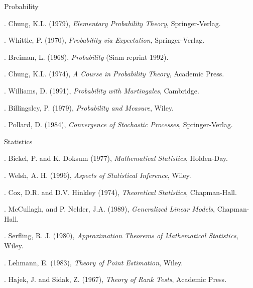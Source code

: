\vspace{5mm}
\noindent
Probability

\vspace{3mm}
.   Chung, K.L. (1979), {\it Elementary Probability Theory}, Springer-Verlag.

.   Whittle, P. (1970), {\it Probability via Expectation}, Springer-Verlag.

.   Breiman, L. (1968), {\it Probability} (Siam reprint 1992).

.   Chung, K.L. (1974), {\it A Course in Probability Theory}, Academic Press.

.   Williams, D. (1991), {\it Probability with Martingales}, Cambridge.

.   Billingsley, P. (1979), {\it Probability and Measure}, Wiley.

.   Pollard, D. (1984), {\it Convergence of Stochastic Processes}, Springer-Verlag.

\vspace{3mm}
\noindent
Statistics

\vspace{3mm}
.  Bickel, P. and K. Doksum (1977), {\it Mathematical Statistics}, Holden-Day.

.  Welsh, A. H. (1996), {\it Aspects of Statistical Inference}, Wiley.

.   Cox, D.R. and D.V. Hinkley (1974), {\it Theoretical Statistics}, Chapman-Hall.

.   McCullagh,  and P. Nelder, J.A. (1989), {\it Generalized Linear Models}, Chapman-Hall.

.   Serfling, R. J. (1980), {\it Approximation Theorems of Mathematical 
Statistics}, Wiley.

.   Lehmann, E. (1983), {\it Theory of Point Estimation}, Wiley.

.   Hajek, J. and Sidak, Z. (1967), {\it Theory of Rank Tests}, Academic Press.


